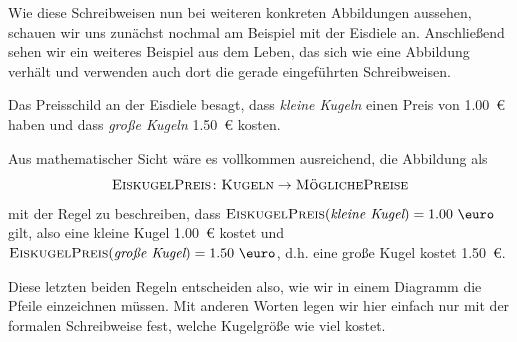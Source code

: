 \documentclass[../../main.tex]{subfiles}
\begin{document}
Wie diese Schreibweisen nun bei weiteren konkreten Abbildungen aussehen, schauen wir uns zunächst nochmal am Beispiel mit der Eisdiele an. Anschließend sehen wir ein weiteres Beispiel aus dem Leben, das sich wie eine Abbildung verhält und verwenden auch dort die gerade eingeführten Schreibweisen.

\begin{example}
    Das Preisschild an der Eisdiele besagt, dass \emph{kleine Kugeln} einen Preis von 1.00~\euro{} haben und dass \emph{große Kugeln} 1.50~\euro{} kosten. 
    
    Aus mathematischer Sicht wäre es vollkommen ausreichend, die Abbildung als \[\textsc{EiskugelPreis}\colon\textsc{Kugeln}\rightarrow\textsc{MöglichePreise}\] 
    mit der Regel zu beschreiben, dass $\textsc{EiskugelPreis}(\textit{kleine Kugel})=\text{1.00 \euro}$ gilt, also eine kleine Kugel 1.00~\euro{} kostet und $\textsc{EiskugelPreis}(\textit{große Kugel})=\text{1.50 \euro}$, d.h. eine große Kugel kostet 1.50~\euro. 
    
    Diese letzten beiden Regeln entscheiden also, wie wir in einem Diagramm die Pfeile einzeichnen müssen. Mit anderen Worten legen wir hier einfach nur mit der formalen Schreibweise fest, welche Kugelgröße wie viel kostet.
\end{example}
\end{document}
